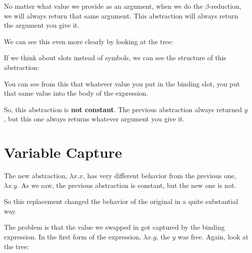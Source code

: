 \documentclass{book}
\numberwithin{equation}{chapter}
\newcommand{\vocab}{\textbf}
\begin{document}
\noindent
No matter what value we provide as an argument, when we do the $\beta$-reduction, we will always return that same argument. This abstraction will always return the argument you give it.

We can see this even more clearly by looking at the tree:

\begin{center}
\end{center}

\noindent
If we think about slots instead of symbols, we can see the structure of this abstraction:

\begin{center}
\end{center}

\noindent
You can see from this that whatever value you put in the binding slot, you put that same value into the body of the expression.

So, this abstraction is \vocab{not constant}. The previous abstraction always returned $y$, but this one always returns whatever argument you give it.


\section{Variable Capture}

The new abstraction, $\lambda x.x$, has very different behavior from the previous one, $\lambda x.y$. As we saw, the previous abstraction is constant, but the new one is not.

So this replacement changed the behavior of the original in a quite substantial way.

The problem is that the value we swapped in got captured by the binding expression. In the first form of the expression, $\lambda x.y$, the $y$ was free. Again, look at the tree:
\end{document}
